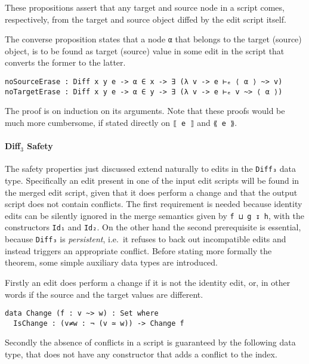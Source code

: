 \documentclass[../Thesis.tex]{subfiles}
\begin{document}
	These propositions assert that any target and
	source node in a script comes, respectively, from the target and
	source object diffed by the edit script itself.
	
	The converse proposition states that a node \texttt{α} that belongs
	to the target (source) object, is to be found as target (source) value 
	in some edit in the script that converts the former to the latter.

\begin{verbatim}
noSourceErase : Diff x y e -> α ∈ x -> ∃ (λ v -> e ⊢ₑ ⟨ α ⟩ ~> v)
noTargetErase : Diff x y e -> α ∈ y -> ∃ (λ v -> e ⊢ₑ v ~> ⟨ α ⟩) 
\end{verbatim}

	The proof is on induction on its arguments. Note that these proofs
	would be much more cumbersome, if stated directly 
	on \texttt{⟦ e ⟧} and \texttt{⟪ e ⟫}.
	
	\paragraph{Diff$_3$ Safety}
	\label{par:diff3-safety}
	The safety properties just discussed extend naturally to edits in the 
	\texttt{Diff₃} data type. Specifically an edit present in one of the input
	edit scripts will be found in the merged edit script, given that it does
	perform a change and that the output script does not contain conflicts.
	The first requirement is needed because identity edits can be silently 
	ignored in the merge semantics given by \texttt{f ⊔ g ↧ h}, with the
	constructors \texttt{Id₁} and   \texttt{Id₂}.
	On the other hand the second prerequisite is essential, because 
	\texttt{Diff₃} is \emph{persistent},
	i.e.\ it refuses to back out incompatible edits and instead triggers 
	an appropriate conflict.
	Before stating more formally the theorem, some simple auxiliary 
	data	types are introduced.

	Firstly an edit does perform a change if it is not the identity edit, or, in 
	other words	if the source and the target values are different.

\begin{verbatim}
data Change (f : v ~> w) : Set where
  IsChange : (v≠w : ¬ (v ≃ w)) -> Change f
\end{verbatim}

	Secondly the absence of conflicts in a script is guaranteed by 
	the following data type, that does not have any constructor that adds
	a conflict to the index.
\end{document}
